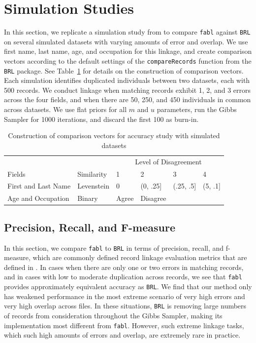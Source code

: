 \documentclass[12pt,letterpaper]{article}
\newcommand{\1}[1]{\mathbb{I}\!\left[#1\right]} %
\begin{document}
\section{Simulation Studies}
\label{sec:simulations}

In this section, we replicate a simulation study from \cite{sadinle2017} to compare \texttt{fabl} against \texttt{BRL} on several simulated datasets with varying amounts of error and overlap. We use first name, last name, age, and occupation for this linkage, and create comparison vectors according to the default settings of the \texttt{compareRecords} function from the \texttt{BRL} package. See Table~\ref{Tab:sadinle_simulation_cutoffs} for details on the construction of comparison vectors. Each simulation identifies duplicated individuals between two datasets, each with 500 records. We conduct linkage when matching records exhibit 1, 2, and 3 errors across the four fields, and when there are 50, 250, and 450 individuals in common across datasets. We use flat priors for all $m$ and $u$ parameters, run the Gibbs Sampler for 1000 iterations, and discard the first 100 as burn-in.

\begin{table}[h!]
	\centering
	\begin{tabular}[t]{ll|llll}
		\hline
		\multicolumn{2}{c|}{ } & \multicolumn{4}{c}{Level of Disagreement} \\
		\cline{3-6}
		Fields & Similarity & 1 & 2 & 3 & 4\\
		\hline
		First and Last Name & Levenstein & 0 & (0, .25] & (.25, .5] & (5, .1]\\
		\hline
		Age and Occupation & Binary & Agree & Disagree &  & \\
		\hline
	\end{tabular}
\caption{Construction of comparison vectors for accuracy study with simulated datasets}
\label{Tab:sadinle_simulation_cutoffs}
\end{table}


\hypertarget{accuracy}{%
	\subsection{Precision, Recall, and F-measure}\label{accuracy}}
	
In this section, we compare \texttt{fabl} to 	\texttt{BRL} in terms of precision, recall, and f-measure, which are commonly defined record linkage evaluation metrics that are defined in \citep{christen_2012}. 
%
In cases when there are only one or two errors in matching records, and in cases with low to moderate duplication across records, we see that \texttt{fabl} provides approximately equivalent accuracy as \texttt{BRL}. 
We find that our method only has weakened performance in the
most extreme scenario of very high errors and very high overlap across
files. In these situations, \texttt{BRL} is removing large numbers of records from consideration throughout the Gibbs Sampler, making its implementation most different from \texttt{fabl}. However,  such extreme linkage tasks, which such high amounts of errors and overlap, are extremely rare in practice. 
\end{document}
